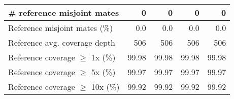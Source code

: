 \documentclass[12pt,a4paper]{article}
\begin{document}
\begin{table}[ht]
\begin{center}
\begin{tabular}{|l*{4}{|r}|}
\# reference misjoint mates & 0 & 0 & 0 & 0 \\ \hline
Reference misjoint mates (\%) & 0.0 & 0.0 & 0.0 & 0.0 \\ \hline
Reference avg. coverage depth & 506 & 506 & 506 & 506 \\ \hline
Reference coverage $\geq$ 1x (\%) & 99.98 & 99.98 & 99.98 & 99.98 \\ \hline
Reference coverage $\geq$ 5x (\%) & 99.97 & 99.97 & 99.97 & 99.97 \\ \hline
Reference coverage $\geq$ 10x (\%) & 99.92 & 99.92 & 99.92 & 99.92 \\ \hline
\end{tabular}
\end{center}
\end{table}
\end{document}

